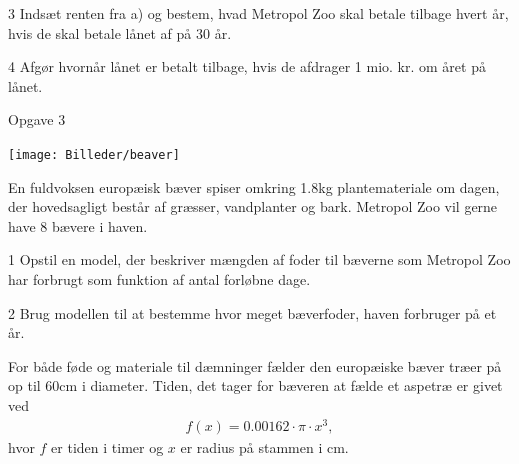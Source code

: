 \begin{delopgave}{}{3}
	Indsæt renten fra a) og bestem, hvad Metropol Zoo skal betale tilbage hvert år, hvis de 
	skal betale lånet af på 30 år.
\end{delopgave}
\begin{delopgave}{}{4}
	Afgør hvornår lånet er betalt tilbage, hvis de afdrager 1 mio. kr. om året på lånet. 
\end{delopgave}

\newpage
\begin{opgavetekst}{Opgave 3}
	\begin{center}
		\texttt{[image: Billeder/beaver]}
	\end{center}
	En fuldvoksen europæisk bæver spiser omkring 1.8kg plantemateriale om dagen, der 
	hovedsagligt består af græsser, vandplanter og bark. Metropol Zoo vil gerne have 8 bævere 
	i haven.
\end{opgavetekst}
\begin{delopgave}{}{1}
	Opstil en model, der beskriver mængden af foder til bæverne som Metropol Zoo har forbrugt
	som funktion af antal forløbne dage. 
\end{delopgave}
\begin{delopgave}{}{2}
	Brug modellen til at bestemme hvor meget bæverfoder, haven forbruger på et år.
\end{delopgave}
\begin{meretekst}
	For både føde og materiale til dæmninger fælder den europæiske bæver træer på op til 60cm i
	diameter. Tiden, det tager for bæveren at fælde et aspetræ er givet ved
	\begin{align*}
		f(x) = 0.00162\cdot \pi \cdot x^3,
	\end{align*}
	hvor $f$ er tiden i timer og $x$ er radius på stammen i cm. 
\end{meretekst}
